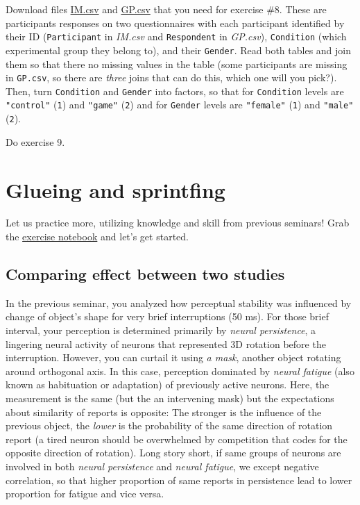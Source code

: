 \documentclass[
]{book}
\begin{document}
Download files \href{data/IM.csv}{IM.csv} and \href{data/GP.csv}{GP.csv} that you need for exercise \#8. These are participants responses on two questionnaires with each participant identified by their ID (\texttt{Participant} in \emph{IM.csv} and \texttt{Respondent} in \emph{GP.csv}), \texttt{Condition} (which experimental group they belong to), and their \texttt{Gender}. Read both tables and join them so that there no missing values in the table (some participants are missing in \texttt{GP.csv}, so there are \emph{three} joins that can do this, which one will you pick?). Then, turn \texttt{Condition} and \texttt{Gender} into factors, so that for \texttt{Condition} levels are \texttt{"control"} (\texttt{1}) and \texttt{"game"} (\texttt{2}) and for \texttt{Gender} levels are \texttt{"female"} (\texttt{1}) and \texttt{"male"} (\texttt{2}).

Do exercise 9.

\hypertarget{seminar08}{%
\chapter{Glueing and sprintfing}\label{seminar08}}

Let us practice more, utilizing knowledge and skill from previous seminars! Grab the \href{notebooks/Seminar\%2008.Rmd}{exercise notebook} and let's get started.

\hypertarget{comparing-effect-between-two-studies}{%
\section{Comparing effect between two studies}\label{comparing-effect-between-two-studies}}

In the previous seminar, you analyzed how perceptual stability was influenced by change of object's shape for very brief interruptions (50 ms). For those brief interval, your perception is determined primarily by \emph{neural persistence}, a lingering neural activity of neurons that represented 3D rotation before the interruption. However, you can curtail it using \emph{a mask}, another object rotating around orthogonal axis. In this case, perception dominated by \emph{neural fatigue} (also known as habituation or adaptation) of previously active neurons. Here, the measurement is the same (but the an intervening mask) but the expectations about similarity of reports is opposite: The stronger is the influence of the previous object, the \emph{lower} is the probability of the same direction of rotation report (a tired neuron should be overwhelmed by competition that codes for the opposite direction of rotation). Long story short, if same groups of neurons are involved in both \emph{neural persistence} and \emph{neural fatigue}, we except negative correlation, so that higher proportion of same reports in persistence lead to lower proportion for fatigue and vice versa.
\end{document}
